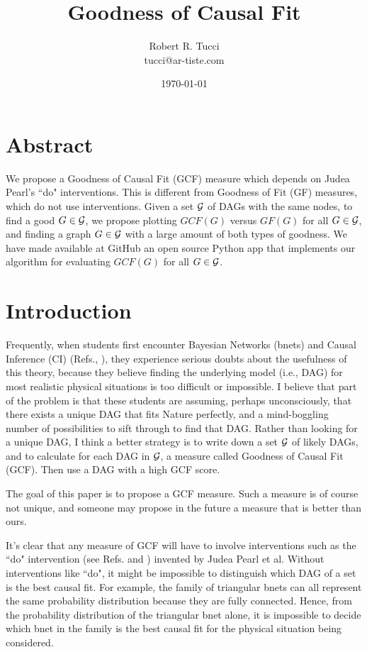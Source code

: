 \documentclass[12pt]{article}
\begin{document}
\title{Goodness of Causal Fit}
\date{ \today}
\author{Robert R. Tucci\\
        tucci@ar-tiste.com}
\maketitle
\vskip2cm
\section*{Abstract}
We propose a 
Goodness of Causal Fit (GCF) measure
which depends 
on Judea Pearl's ``do" interventions.
This is different
from Goodness of Fit (GF) measures,
which do not use interventions.
Given a set ${\cal G}$
of DAGs with the same nodes,
to find a good $G\in {\cal G}$,
we propose plotting
$GCF(G)$ versus $GF(G)$
for all $G\in {\cal G}$,
and finding a 
graph $G\in {\cal G}$  with 
a large amount 
of both types of goodness.
We have made 
available at GitHub
an open source Python app that implements
our algorithm for evaluating
$GCF(G)$ for all $G\in{\cal G}$.

\newpage
\section{Introduction}



Frequently,
when students
first encounter
Bayesian Networks (bnets)
and Causal Inference (CI)
(Refs.\cite{pearl-2013book},
\cite{bayesuvius}),
they experience serious doubts
about the usefulness of this
theory, because they believe
finding the underlying model 
(i.e., DAG)
for most realistic
 physical situations is
too difficult or impossible.
I believe
that part of the problem
is that these students
are assuming, perhaps
unconsciously,
that there exists
a unique DAG
that fits Nature perfectly,
and a mind-boggling number
 of possibilities
to sift through to find that DAG.
Rather than looking
for a unique DAG,
I think a better strategy
is to write down
a set ${\cal G}$ 
of likely DAGs,
and to calculate for 
each DAG in ${\cal G}$,
 a measure called 
Goodness of Causal Fit (GCF).
Then use a DAG with
 a high GCF score.
 
 The goal of this paper
 is to propose a GCF measure.
 Such a measure is of course
 not unique,
 and someone may propose 
 in the future a measure that is better
 than ours.
 
 
 It's clear that any measure
 of GCF will have to
 involve interventions
 such as the ``do" intervention
 (see 
 Refs. \cite{pearl-2013book}
 and \cite{bayesuvius})
 invented by Judea Pearl et al.
 Without interventions like ``do",
 it might be impossible
 to distinguish which DAG
 of a set is the best causal fit.
 For example, the family of triangular
 bnets can 
 all represent the same
 probability distribution
 because they are fully connected.
Hence, from the 
probability distribution of the
triangular bnet alone,
it is impossible to decide
which bnet in the family is
the best causal fit for the
physical situation 
being considered.
\end{document}
